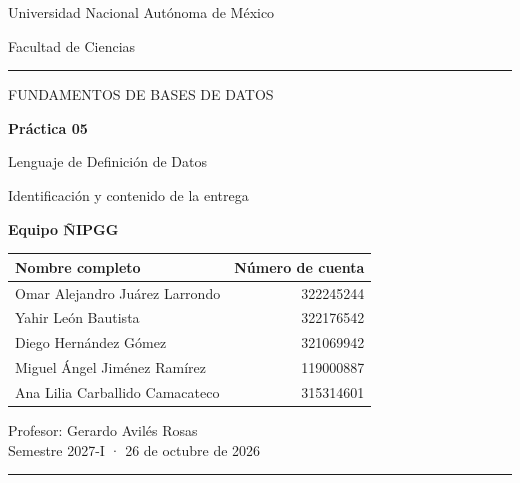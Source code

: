 \documentclass[11pt]{article}
\begin{document}
\hypersetup{pageanchor=false}
\begin{titlepage}
\thispagestyle{empty}
{\sffamily\color{Tinta}\large Universidad Nacional Autónoma de México\par
\normalsize Facultad de Ciencias\par}
\vspace{9mm}
{\color{Acento}\rule{\linewidth}{1.2pt}\par}
\vspace{14mm}
{\sffamily\color{Acento}\large FUNDAMENTOS DE BASES DE DATOS\par}
\vspace{6mm}
{\sffamily\color{Tinta}\fontsize{32}{38}\selectfont\bfseries Práctica 05\par}
\vspace{4mm}
{\sffamily\color{Tinta}\fontsize{21}{27}\selectfont Lenguaje de Definición de Datos\par}
\vspace{7mm}
{\large Identificación y contenido de la entrega\par}
\vfill
{\sffamily\color{Tinta}\large\bfseries Equipo ÑIPGG\par}
\vspace{4mm}
\begin{tabularx}{\linewidth}{@{}Xr@{}}
\toprule
\textbf{Nombre completo} & \textbf{Número de cuenta}\\\midrule
Omar Alejandro Juárez Larrondo & 322245244\\[5pt]
Yahir León Bautista & 322176542\\[5pt]
Diego Hernández Gómez & 321069942\\[5pt]
Miguel Ángel Jiménez Ramírez & 119000887\\[5pt]
Ana Lilia Carballido Camacateco & 315314601\\\bottomrule
\end{tabularx}\par
\vspace{9mm}
Profesor: Gerardo Avilés Rosas\\
Semestre 2027-I · 26 de octubre de 2026\par
\vspace{7mm}
{\color{Linea}\rule{\linewidth}{.6pt}\par}
\end{titlepage}
\hypersetup{pageanchor=true}
\end{document}
